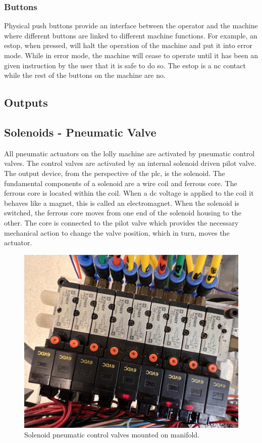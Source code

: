     \subsubsection{Buttons}
    Physical push buttons provide an interface between the operator and the machine where different buttons are linked to different machine functions. For example, an \acrfull{estop}, when pressed, will halt the operation of the machine and put it into error mode. While in error mode, the machine will cease to operate until it has been an given instruction by the user that it is safe to do so. The \acrshort{estop} is a \acrshort{nc} contact while the rest of the buttons on the machine are \acrshort{no}.
    
\subsection{Outputs}
    \subsection{Solenoids - Pneumatic Valve}
    All pneumatic actuators on the lolly machine are activated by pneumatic control valves. The control valves are activated by an internal solenoid driven pilot valve.  The output device, from the perspective of the \acrshort{plc}, is the solenoid. The fundamental components of a solenoid are a wire coil and ferrous core. The ferrous core is located within the coil. When a \acrshort{dc} voltage is applied to the coil it behaves like a magnet, this is called an electromagnet. When the solenoid is switched, the ferrous core moves from one end of the solenoid housing to the other. The core is connected to the pilot valve which provides the necessary mechanical action to change the valve position, which in turn, moves the actuator. 
    
        \begin{figure}[H]
            \centering
            \includegraphics[scale = 0.5]{2_images/controlValvesPic.png}
            \caption{Solenoid pneumatic control valves mounted on manifold.}
            \label{fig:controlValvesPic}
        \end{figure} 
    
